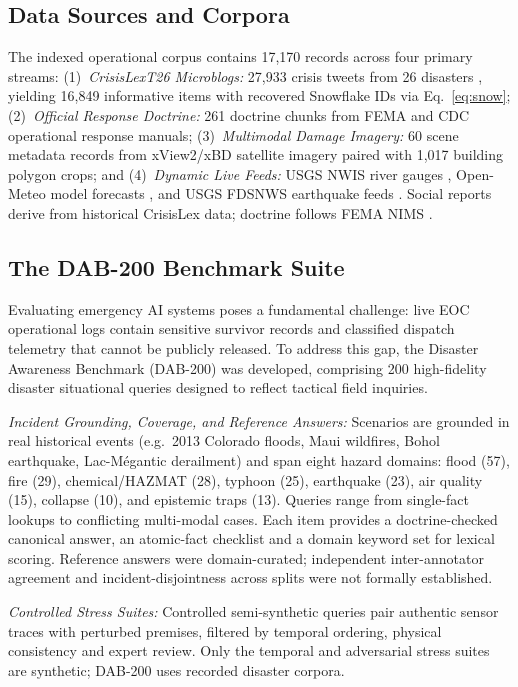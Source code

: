 \documentclass[conference]{IEEEtran}
\begin{document}
\subsection{Data Sources and Corpora}
The indexed operational corpus contains 17,170 records across four primary streams: (1)~\textit{CrisisLexT26 Microblogs:} 27,933 crisis tweets from 26 disasters \cite{olteanu2015}, yielding 16,849 informative items with recovered Snowflake IDs via Eq.~\eqref{eq:snow}; (2)~\textit{Official Response Doctrine:} 261 doctrine chunks from FEMA and CDC operational response manuals; (3)~\textit{Multimodal Damage Imagery:} 60 scene metadata records from xView2/xBD satellite imagery \cite{xview2} paired with 1,017 building polygon crops; and (4)~\textit{Dynamic Live Feeds:} USGS NWIS river gauges \cite{usgsnwis}, Open-Meteo model forecasts \cite{openmeteo}, and USGS FDSNWS earthquake feeds \cite{usgsfdsn}. Social reports derive from historical CrisisLex data; doctrine follows FEMA NIMS \cite{femanims}.

\subsection{The DAB-200 Benchmark Suite}
Evaluating emergency AI systems poses a fundamental challenge: live EOC operational logs contain sensitive survivor records and classified dispatch telemetry that cannot be publicly released. To address this gap, the Disaster Awareness Benchmark (DAB-200) \cite{dab200} was developed, comprising 200 high-fidelity disaster situational queries designed to reflect tactical field inquiries.

\textit{Incident Grounding, Coverage, and Reference Answers:} Scenarios are grounded in real historical events (e.g.\ 2013 Colorado floods, Maui wildfires, Bohol earthquake, Lac-M\'{e}gantic derailment) \cite{olteanu2015} and span eight hazard domains: flood (57), fire (29), chemical/HAZMAT (28), typhoon (25), earthquake (23), air quality (15), collapse (10), and epistemic traps (13). Queries range from single-fact lookups to conflicting multi-modal cases. Each item provides a doctrine-checked canonical answer, an atomic-fact checklist and a domain keyword set for lexical scoring. Reference answers were domain-curated; independent inter-annotator agreement and incident-disjointness across splits were not formally established.

\textit{Controlled Stress Suites:} Controlled semi-synthetic queries pair authentic sensor traces with perturbed premises, filtered by temporal ordering, physical consistency and expert review. Only the temporal and adversarial stress suites are synthetic; DAB-200 uses recorded disaster corpora.
\end{document}
